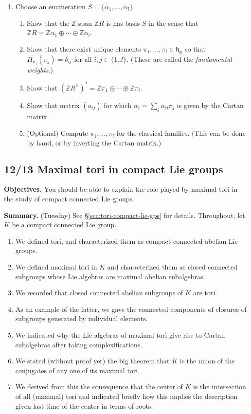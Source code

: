 \documentclass[reqno]{amsart} 
\begin{document}
\begin{homework}
\begin{enumerate}
  \item 
    Choose an enumeration
    $S = \{\alpha_1,\dotsc,\alpha_l\}$.
    \begin{enumerate}
    \item Show that the $\mathbb{Z}$-span $\mathbb{Z} R$
      is has basis $S$ in the sense that $\mathbb{Z} R = \mathbb{Z} \alpha_1 \oplus
      \dotsb \oplus \mathbb{Z} \alpha_l$.
    \item Show that there exist unique elements
      $\pi_1,\dotsc,\pi_l \in \mathfrak{h}_\mathbb{R}$
      so that $H_{\alpha_i}(\pi_j) = \delta_{i j}$ for all $i,j
      \in \{1..l\}$.
      (These are called the \emph{fundamental weights}.)
    \item Show that $(\mathbb{Z} R^\wedge)^* = \mathbb{Z} \pi_1
      \oplus 
      \dotsb \oplus \mathbb{Z} \pi_l$.
    \item Show that matrix $(a_{i j})$ for which
      $\alpha_i = \sum_j a_{i j} \pi_j$
      is given by the Cartan matrix.
    \item
      (Optional) Compute $\pi_1, \dotsc, \pi_l$
      for the classical families.      (This can be done by hand, or by inverting the Cartan
      matrix.)


    \end{enumerate}
  \end{enumerate}
\end{homework}
\newpage

\subsection{12/13 Maximal tori in compact Lie groups}
\label{sec:org070bbf1}
\textbf{Objectives.} You should be able to explain the role played by maximal
tori in the study of compact connected Lie groups.

\textbf{Summary.} 
(Tuesday)
See \S\ref{sec:tori-compact-lie-gps} for details.
Throughout, let \(K\) be a compact connected Lie group.
\begin{enumerate}
\item We defined tori, and characterized them as compact connected
abelian Lie groups.
\item We defined maximal tori in \(K\) and characterized them as closed
connected subgroups whose Lie algebras are maximal abelian subalgebras.
\item We recorded that closed connected abelian subgroups of \(K\) are
tori.
\item As an example of the latter, we gave the connected components of
closures of subgroups generated by individual elements.
\item We indicated why the Lie algebras of maximal tori give rise to
Cartan subalgebras after taking complexifications.
\item We stated (without proof yet) the big theorem that \(K\) is the union
of the conjugates of any one of its maximal tori.
\item We derived from this the consequence that the center of \(K\) is the
intersection of all (maximal) tori and indicated briefly how this
implies the description given last time of the center in terms of
roots.
\end{enumerate}
\end{document}
